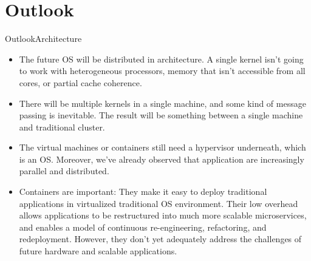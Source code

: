 \documentclass[10pt]{beamer}
\begin{document}
\section{Outlook}
\begin{frame}{Outlook}{Architecture}
  \begin{itemize}
    \item The future OS will be distributed in architecture. A single kernel
          isn't going to work with heterogeneous processors, memory that isn't
          accessible from all cores, or partial cache coherence.
    \item There will be multiple kernels in a single machine, and some kind of
          message passing is inevitable. The result will be something between a
          single machine and traditional cluster.
    \item The virtual machines or containers still need a hypervisor
          underneath, which is an OS. Moreover, we've already observed that
          application are increasingly parallel and distributed.
    \item Containers are important: They make it easy to deploy traditional
          applications in virtualized traditional OS environment. Their low
          overhead allows applications to be restructured into much more
          scalable microservices, and enables a model of continuous
          re-engineering, refactoring, and redeployment. However, they don't
          yet adequately address the challenges of future hardware and scalable
          applications.
  \end{itemize}
\end{frame}

\end{document}
